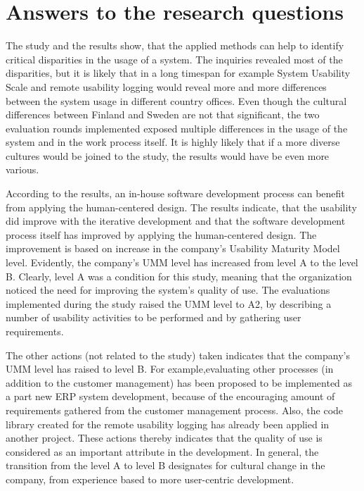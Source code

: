 \documentclass[12pt,a4paper,oneside,pdftex]{report}
\begin{document}
\section{Answers to the research questions}

The study and the results show, that the applied methods can help to identify critical disparities in the usage of a system. The inquiries revealed most of the disparities, but it is likely that in a long timespan for example System Usability Scale and remote usability logging would reveal more and more differences between the system usage in different country offices. Even though the cultural differences between Finland and Sweden are not that significant, the two evaluation rounds implemented exposed multiple differences in the usage of the system and in the work process itself. It is highly likely that if a more diverse cultures would be joined to the study, the results would have be even more various. 

According to the results, an in-house software development process can benefit from applying the human-centered design. The results indicate, that the usability did improve with the iterative development and that the software development process itself has improved by applying the human-centered design. The improvement is based on increase in the company's Usability Maturity Model level. Evidently, the company's UMM level has increased from level A to the level B. Clearly, level A was a condition for this study, meaning that the organization noticed the need for improving the system's quality of use. The evaluations implemented during the study raised the UMM level to A2, by describing a number of usability activities to be performed and by gathering user requirements. 

The other actions (not related to the study) taken indicates that the company's UMM level has raised to level B. For example,evaluating other processes (in addition to the customer management) has been proposed to be implemented as a part new ERP system development, because of the encouraging amount of requirements gathered from the customer management process. Also, the code library created for the remote usability logging has already been applied in another project. These actions thereby indicates that the quality of use is considered as an important attribute in the development. In general, the transition from the level A to level B designates for cultural change in the company, from experience based to more user-centric development. 
\end{document}
